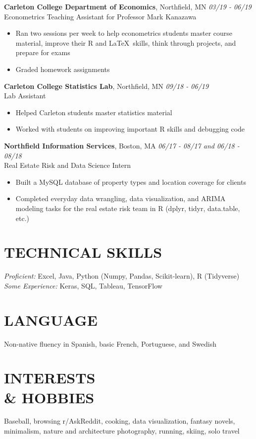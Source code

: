 \documentclass[margin, 10pt]{res} %
\begin{document}
\begin{resume}
{\sl} \textbf{Carleton College Department of Economics}, Northfield, MN \hfill \textit{03/19 - 06/19}\\
{\sl} Econometrics Teaching Assistant for Professor Mark Kanazawa\smallskip
{\sl} \begin{itemize}
	\item Ran two sessions per week to help econometrics students master course material, improve their R and \LaTeX \ skills, think through projects, and prepare for exams
	\item Graded homework assignments
\end{itemize}


{\sl} \textbf{Carleton College Statistics Lab}, Northfield, MN \hfill \textit{09/18 - 06/19}\\
{\sl} Lab Assistant \smallskip
{\sl} \begin{itemize}
\item Helped Carleton students master statistics material
\item Worked with students on improving important R skills and debugging code
\end{itemize}

{\sl} \textbf{Northfield Information Services}, Boston, MA \hfill \textit{06/17 - 08/17 and 06/18 - 08/18}\\
{\sl} Real Estate Risk and Data Science Intern \smallskip
{\sl} \begin{itemize}
\item Built a MySQL database of property types and location coverage for clients
\item Completed everyday data wrangling, data visualization, and ARIMA modeling tasks for the real estate risk team in R (dplyr, tidyr, data.table, etc.)
\end{itemize}


\section{TECHNICAL SKILLS}
{\sl Proficient:} Excel, Java, Python (Numpy, Pandas, Scikit-learn), R (Tidyverse)\\ \smallskip
{\sl Some Experience:} Keras, SQL, Tableau, TensorFlow

\section{LANGUAGE}
{\sl} Non-native fluency in Spanish, basic French, Portuguese, and Swedish

\section{INTERESTS \\\& HOBBIES}
{\sl} Baseball, browsing r/AskReddit, cooking, data visualization, fantasy novels, minimalism, nature and architecture photography, running, skiing, solo travel

\end{resume}
\end{document}
